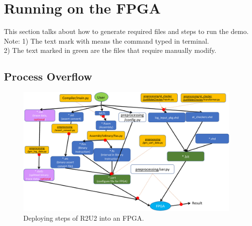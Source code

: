 
\section{Running on the FPGA}
This section talks about how to generate required files and steps to run the demo. \\
Note: 1) The text mark with \colorbox{blue!30}{\hspace{0.5cm}} means the command typed in terminal.\\
2) The text marked in \textcolor{green!100}{green} are the files that require manually modify.

\subsection{Process Overflow}
\begin{figure}[H]
	\includegraphics[scale=0.50]{fig/r2u2_fpga_flow.pdf}
	\caption{Deploying steps of R2U2 into an FPGA.}
	\label{fig:fpga_flow}
\end{figure}

